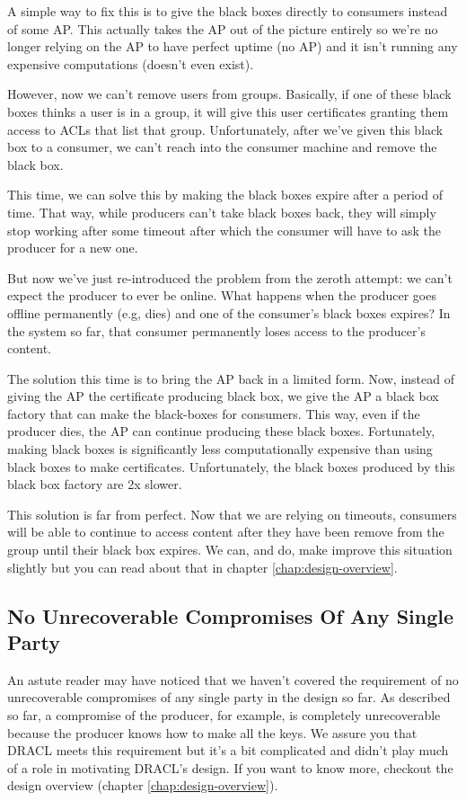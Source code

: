 \documentclass[pdftex,12pt,a4papaer,twoside,notitlepage]{report}
\begin{document}
A simple way to fix this is to give the black boxes directly to consumers
instead of some AP. This actually takes the AP out of the picture entirely so
we're no longer relying on the AP to have perfect uptime (no AP) and it isn't
running any expensive computations (doesn't even exist).

However, now we can't remove users from groups. Basically, if one of these black
boxes thinks a user is in a group, it will give this user certificates granting
them access to ACLs that list that group. Unfortunately, after we've given this
black box to a consumer, we can't reach into the consumer machine and remove the
black box.

This time, we can solve this by making the black boxes expire after a period of
time. That way, while producers can't take black boxes back, they will simply
stop working after some timeout after which the consumer will have to ask the
producer for a new one.

But now we've just re-introduced the problem from the zeroth attempt: we can't
expect the producer to ever be online. What happens when the producer goes
offline permanently (e.g, dies) and one of the consumer's black boxes expires?
In the system so far, that consumer permanently loses access to the producer's
content.

The solution this time is to bring the AP back in a limited form. Now, instead
of giving the AP the certificate producing black box, we give the AP a black box
factory that can make the black-boxes for consumers. This way, even if the
producer dies, the AP can continue producing these black boxes. Fortunately,
making black boxes is significantly less computationally expensive than using
black boxes to make certificates. Unfortunately, the black boxes produced by
this black box factory are 2x slower.

This solution is far from perfect. Now that we are relying on timeouts,
consumers will be able to continue to access content after they have been remove
from the group until their black box expires. We can, and do, make improve this
situation slightly but you can read about that in chapter
\ref{chap:design-overview}.

\subsection{No Unrecoverable Compromises Of Any Single Party}

An astute reader may have noticed that we haven't covered the requirement of no
unrecoverable compromises of any single party in the design so far. As described
so far, a compromise of the producer, for example, is completely unrecoverable
because the producer knows how to make all the keys. We assure you that DRACL
meets this requirement but it's a bit complicated and didn't play much of a role
in motivating DRACL's design. If you want to know more, checkout the design
overview (chapter \ref{chap:design-overview}).
\end{document}
